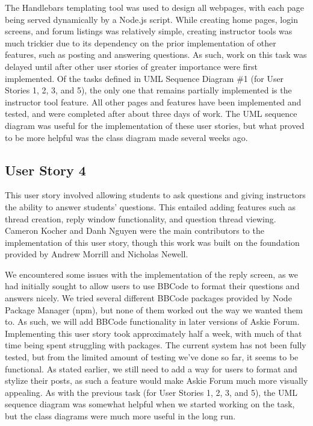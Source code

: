 \documentclass[12pt]{article}
\begin{document}
\begin{flushleft}
The Handlebars templating tool was used to design all webpages, with each page being served dynamically by a Node.js script. While creating home pages, login screens, and forum listings was relatively simple, creating instructor tools was much trickier due to its dependency on the prior implementation of other features, such as posting and answering questions. As such, work on this task was delayed until after other user stories of greater importance were first implemented. Of the tasks defined in UML Sequence Diagram \#1 (for User Stories 1, 2, 3, and 5), the only one that remains partially implemented is the instructor tool feature. All other pages and features have been implemented and tested, and were completed after about three days of work. The UML sequence diagram was useful for the implementation of these user stories, but what proved to be more helpful was the class diagram made several weeks ago.
\end{flushleft}

\subsection{User Story 4}
\begin{flushleft}
This user story involved allowing students to ask questions and giving instructors the ability to answer students' questions. This entailed adding features such as thread creation, reply window functionality, and question thread viewing. Cameron Kocher and Danh Nguyen were the main contributors to the implementation of this user story, though this work was built on the foundation provided by Andrew Morrill and Nicholas Newell. 
\end{flushleft}

\begin{flushleft}
We encountered some issues with the implementation of the reply screen, as we had initially sought to allow users to use BBCode to format their questions and answers nicely. We tried several different BBCode packages provided by Node Package Manager (npm), but none of them worked out the way we wanted them to. As such, we will add BBCode functionality in later versions of Askie Forum. Implementing this user story took approximately half a week, with much of that time being spent struggling with packages. The current system has not been fully tested, but from the limited amount of testing we've done so far, it seems to be functional. As stated earlier, we still need to add a way for users to format and stylize their posts, as such a feature would make Askie Forum much more visually appealing. As with the previous task (for User Stories 1, 2, 3, and 5), the UML sequence diagram was somewhat helpful when we started working on the task, but the class diagrams were much more useful in the long run.
\end{flushleft}
\end{document}
